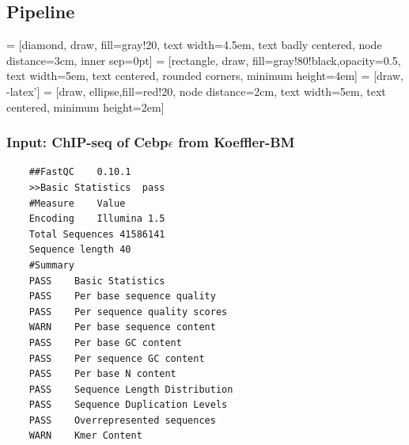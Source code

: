 \documentclass[notes]{beamer}
\begin{document}
\subsection{Pipeline}                  
\begin{frame}[plain]
    \begin{center}

     = [diamond, draw, fill=gray!20, 
        text width=4.5em, text badly centered, node distance=3cm, inner sep=0pt]
     = [rectangle, draw, fill=gray!80!black,opacity=0.5, 
        text width=5em, text centered, rounded corners, minimum height=4em]
     = [draw, -latex']
     = [draw, ellipse,fill=red!20, node distance=2cm,
        text width=5em, text centered, minimum height=2em]
        

    \end{center}
\end{frame}

\begin{frame}
    \frametitle{Input: ChIP-seq of Cebp$\epsilon$ from Koeffler-BM}
    \begin{lstlisting}
    ##FastQC    0.10.1
    >>Basic Statistics  pass
    #Measure    Value   
    Encoding    Illumina 1.5    
    Total Sequences 41586141    
    Sequence length 40  
    #Summary
    PASS    Basic Statistics    
    PASS    Per base sequence quality   
    PASS    Per sequence quality scores 
    WARN    Per base sequence content   
    PASS    Per base GC content 
    PASS    Per sequence GC content 
    PASS    Per base N content  
    PASS    Sequence Length Distribution    
    PASS    Sequence Duplication Levels 
    PASS    Overrepresented sequences   
    WARN    Kmer Content    
    \end{lstlisting}
\end{frame}
    
\end{document}
